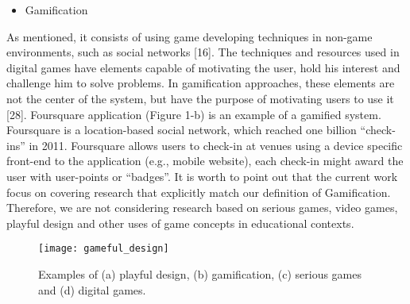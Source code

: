 \begin{itemize}
\item Gamification
\end{itemize}
As mentioned, it consists of using game developing techniques in
non-game environments, such as social networks [16]. The
techniques and resources used in digital games have elements
capable of motivating the user, hold his interest and challenge him
to solve problems. In gamification approaches, these elements are
not the center of the system, but have the purpose of motivating
users to use it [28]. Foursquare application (Figure 1-b) is an
example of a gamified system. Foursquare is a location-based
social network, which reached one billion “check-ins” in 2011.
Foursquare allows users to check-in at venues using a device specific
front-end to the application (e.g., mobile website), each
check-in might award the user with user-points or “badges”.
It is worth to point out that the current work focus on covering
research that explicitly match our definition of Gamification.
Therefore, we are not considering research based on serious games,
video games, playful design and other uses of game concepts in
educational contexts.

\begin{figure}[h!]
\caption{Examples of (a) playful design, (b) gamification, (c)
serious games and (d) digital games.}
\centering
\texttt{[image: gameful\_design]}
\end{figure}